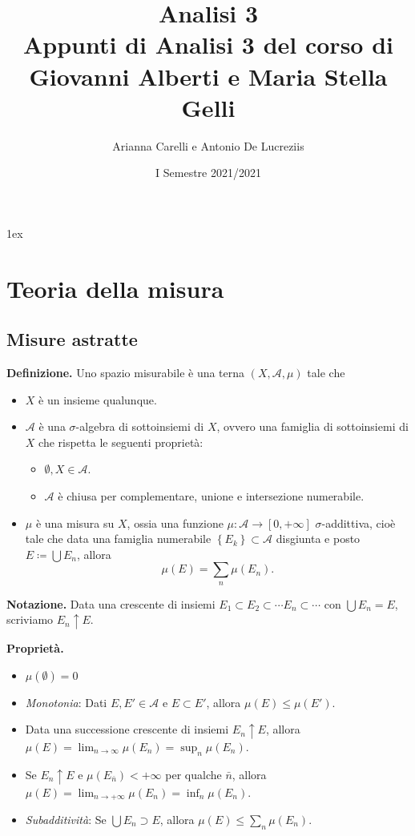 \documentclass[a4paper, 12pt]{report}
\title{{\Huge Analisi 3}\\{\small Appunti di Analisi 3 del corso di Giovanni Alberti e Maria Stella Gelli}}
\author{Arianna Carelli e Antonio De Lucreziis}
\date{I Semestre 2021/2021}
\begin{document}
%
%
\parskip 1ex
\setlength{\parindent}{0pt}

\maketitle

\tableofcontents
\newpage

\chapter{Teoria della misura}

\section{Misure astratte}

\textbf{Definizione.} 
Uno spazio misurabile è una terna $(X, \mathcal A, \mu)$ tale che
\begin{itemize}
	
	\item $X$ è un insieme qualunque.

	\item $\mathcal{A}$ è una $\sigma$-algebra di sottoinsiemi di $X$, ovvero una famiglia di sottoinsiemi di $X$ che rispetta le seguenti proprietà:
		\begin{itemize}
			\item $\emptyset, X \in \mathcal{A}$.
			\item $\mathcal{A}$ è chiusa per complementare, unione e intersezione numerabile.
		\end{itemize}
	
	\item $\mu$ è una misura su $X$, ossia una funzione $\mu \colon \mathcal A \to [0, +\infty]$ $\sigma$-addittiva, cioè tale che data una famiglia numerabile $\left\{ E_k \right\} \subset \mathcal A$ disgiunta e posto $E \coloneqq \bigcup E_n $, allora
		$$
		\mu(E) = \sum_{n} \mu (E_n).
		$$

\end{itemize}


\textbf{Notazione.}
Data una crescente di insiemi $E_1 \subset E_2 \subset \cdots E_n \subset \cdots$ con $\bigcup E_n = E$, scriviamo $E_n \uparrow E$.

\textbf{Proprietà.}
\begin{itemize}
	\item $\mu(\emptyset) = 0$
	\item \textit{Monotonia}: Dati $E,E' \in \mathcal{A}$ e $E \subset E'$, allora $\mu(E) \leq \mu(E')$.
	\item Data una successione crescente di insiemi $E_n \uparrow E$, allora $\mu(E) = \lim_{n \to \infty} \mu(E_n) = \sup_{n} \mu(E_n)$.
	\item Se $E_n \uparrow E$ e $\mu (E_{\bar{n}}) < +\infty$ per qualche $\bar{n}$, allora $\mu(E) = \lim_{n \to + \infty} \mu(E_n) = \inf_{n} \mu(E_n)$.
	\item \textit{Subadditività}: Se $\bigcup E_n \supset E$, allora $\mu(E) \leq \sum_{n} \mu(E_n)$.
\end{itemize}
\end{document}
